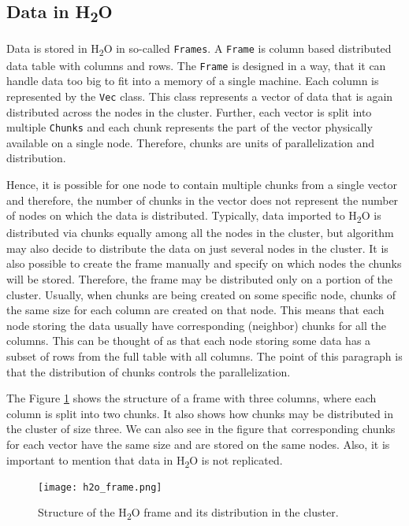 \subsection{Data in H\textsubscript{2}O}
Data is stored in H\textsubscript{2}O in so-called \texttt{Frames}. A \texttt{Frame} is column based distributed data table with columns and rows. The \texttt{Frame} is designed in a way, that it can handle data too big to fit into a memory of a single machine. Each column is represented by the \texttt{Vec} class. This class represents a vector of data that is again distributed across the nodes in the cluster. Further, each vector is split into multiple \texttt{Chunks} and each chunk represents the part of the vector physically available on a single node. Therefore, chunks are units of parallelization and distribution.

Hence, it is possible for one node to contain multiple chunks from a single vector and therefore, the number of chunks in the vector does not represent the number of nodes on which the data is distributed. Typically, data imported to H\textsubscript{2}O is distributed via chunks equally among all the nodes in the cluster, but algorithm may also decide to distribute the data on just several nodes in the cluster. It is also possible to create the frame manually and specify on which nodes the chunks will be stored. Therefore, the frame may be distributed only on a portion of the cluster. Usually, when chunks are being created on some specific node, chunks of the same size for each column are created on that node. This means that each node storing the data usually have corresponding (neighbor) chunks for all the columns. This can be thought of as that each node storing some data has a subset of rows from the full table with all columns. The point of this paragraph is that the distribution of chunks controls the parallelization.

The Figure \ref{fig:h2o_frame} shows the structure of a frame with three columns, where each column is split into two chunks. It also shows how chunks may be distributed in the cluster of size three. We can also see in the figure that corresponding chunks for each vector have the same size and are stored on the same nodes. Also, it is important to mention that data in H\textsubscript{2}O is not replicated.

	\begin{figure}
		\centering
		\texttt{[image: h2o\_frame.png]}
		\caption{Structure of the H\textsubscript{2}O frame and its distribution in the cluster.}
		\label{fig:h2o_frame}
	\end{figure}

